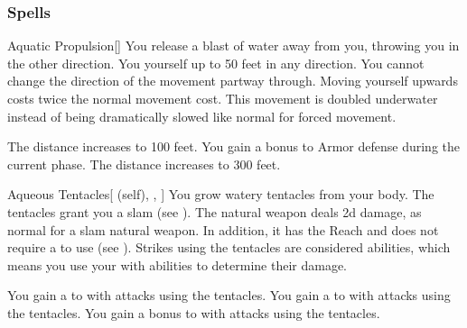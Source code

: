 \subsubsection{Spells}


\lowercase{\hypertarget{spell:Aquatic Propulsion}{}}\label{spell:Aquatic Propulsion}
\begin{freeability}[Rank 1]{\hypertarget{spell:Aquatic Propulsion}{Aquatic Propulsion}}[]
You release a blast of water away from you, throwing you in the other direction.
You  yourself up to 50 feet in any direction.
You cannot change the direction of the movement partway through.
Moving yourself upwards costs twice the normal movement cost.
This movement is doubled underwater instead of being dramatically slowed like normal for forced movement.

\rankline
{} The distance increases to 100 feet.
 You gain a  bonus to Armor defense during the current phase.
 The distance increases to 300 feet.
\end{freeability}
\vspace{0.25em}



\lowercase{\hypertarget{spell:Aqueous Tentacles}{}}\label{spell:Aqueous Tentacles}
\begin{attuneability}[Rank 1]{\hypertarget{spell:Aqueous Tentacles}{Aqueous Tentacles}}[ (self), , ]
You grow watery tentacles from your body.
The tentacles grant you a slam  (see ).
The natural weapon deals \plus2d damage, as normal for a slam natural weapon.
In addition, it has the Reach  and does not require a  to use (see ).
Strikes using the tentacles are considered  abilities, which means you use your  with  abilities to determine their damage.

\rankline
{} You gain a   to  with attacks using the tentacles.
 You gain a   to  with attacks using the tentacles.
 You gain a  bonus to  with attacks using the tentacles.
\end{attuneability}
\vspace{0.25em}



